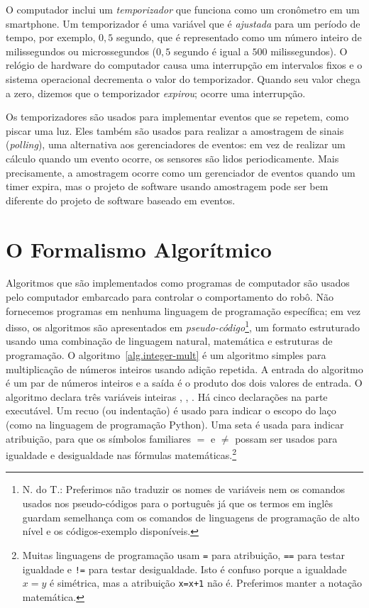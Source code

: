 O computador inclui um \emph{temporizador} que funciona como um cronômetro em um smartphone. Um temporizador é uma variável que é \emph{ajustada} para um período de tempo, por exemplo, $0,5$ segundo, que é representado como um número inteiro de milissegundos ou microssegundos ($0,5$ segundo é igual a $500$ milissegundos). O relógio de hardware do computador causa uma interrupção em intervalos fixos e o sistema operacional decrementa o valor do temporizador. Quando seu valor chega a zero, dizemos que o temporizador \emph{expirou}; ocorre uma interrupção.

Os temporizadores são usados para implementar eventos que se repetem, como piscar uma luz. Eles também são usados para realizar a amostragem de sinais (\emph{polling}), uma alternativa aos gerenciadores de eventos: em vez de realizar um cálculo quando um evento ocorre, os sensores são lidos periodicamente. Mais precisamente, a amostragem ocorre como um gerenciador de eventos quando um timer expira, mas o projeto de software usando amostragem pode ser bem diferente do projeto de software baseado em eventos.

\section{O Formalismo Algorítmico}\label{s.alg-formalism}

Algoritmos que são implementados como programas de computador são usados pelo computador embarcado para controlar o comportamento do robô. Não fornecemos programas em nenhuma linguagem de programação específica; em vez disso, os algoritmos são apresentados em \emph{pseudo-código}\footnote{N. do T.: Preferimos não traduzir os nomes de variáveis nem os comandos usados nos pseudo-códigos para o português já que os termos em inglês guardam semelhança com os comandos de linguagens de programação de alto nível e os códigos-exemplo disponíveis.}, um formato estruturado usando uma combinação de linguagem natural, matemática e estruturas de programação. O algoritmo~\ref{alg.integer-mult} é um algoritmo simples para multiplicação de números inteiros usando adição repetida. A entrada do algoritmo é um par de números inteiros e a saída é o produto dos dois valores de entrada. O algoritmo declara três variáveis inteiras , , . Há cinco declarações na parte executável. Um recuo (ou indentação) é usado para indicar o escopo do laço (como na linguagem de programação Python). Uma seta é usada para indicar atribuição, para que os símbolos familiares $=$ e $\neq$ possam ser usados para igualdade e desigualdade nas fórmulas matemáticas.\footnote{Muitas linguagens de programação usam \texttt{=} para atribuição, \texttt{==} para testar igualdade e \texttt{!=} para testar desigualdade. Isto é confuso porque a igualdade $x=y$ é simétrica, mas a atribuição \texttt{x=x+1} não é. Preferimos manter a notação matemática.}

